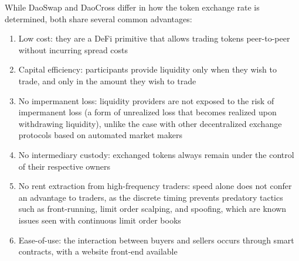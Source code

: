 \documentclass[11pt, reqno]{amsart}
\theoremstyle{definition}
\theoremstyle{remark}
\begin{document}
While DaoSwap and DaoCross differ in how the token exchange rate is determined,
both share several common advantages:
\begin{enumerate}
	\item Low cost:
	      they are a DeFi primitive that allows trading tokens peer-to-peer
	      without incurring spread costs
	\item Capital efficiency:
	      participants provide liquidity only when
	      they wish to trade, and only in the amount they wish to trade
	\item No impermanent loss:
	      liquidity providers are not exposed to the risk of impermanent loss
	      (a form of unrealized loss that becomes realized upon withdrawing
	      liquidity), unlike the case with other decentralized exchange protocols
	      based on automated market makers
	\item No intermediary custody:
	      exchanged tokens always remain under the control of their respective
	      owners
	\item No rent extraction from high-frequency traders:
	      speed alone does not confer an advantage to traders, as the discrete
	      timing prevents predatory tactics such as front-running, limit order
	      scalping, and spoofing, which are known issues seen with continuous
	      limit order books
	\item Ease-of-use: the interaction between buyers and sellers occurs
	      through smart contracts, with a website front-end available
\end{enumerate}


\end{document}
